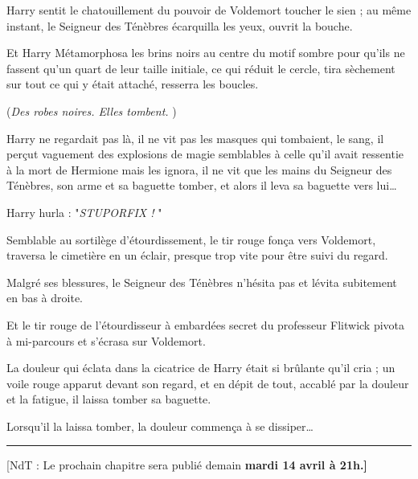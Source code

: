 Harry sentit le chatouillement du pouvoir de Voldemort toucher le sien ; au même instant, le Seigneur des Ténèbres écarquilla les yeux, ouvrit la bouche.

Et Harry Métamorphosa les brins noirs au centre du motif sombre pour qu'ils ne fassent qu'un quart de leur taille initiale, ce qui réduit le cercle, tira sèchement sur tout ce qui y était attaché, resserra les boucles.

(\emph{Des robes noires. Elles tombent.} )

Harry ne regardait pas là, il ne vit pas les masques qui tombaient, le sang, il perçut vaguement des explosions de magie semblables à celle qu'il avait ressentie à la mort de Hermione mais les ignora, il ne vit que les mains du Seigneur des Ténèbres, son arme et sa baguette tomber, et alors il leva sa baguette vers lui…

Harry hurla : "\emph{STUPORFIX !} "

Semblable au sortilège d'étourdissement, le tir rouge fonça vers Voldemort, traversa le cimetière en un éclair, presque trop vite pour être suivi du regard.

Malgré ses blessures, le Seigneur des Ténèbres n'hésita pas et lévita subitement en bas à droite.

Et le tir rouge de l'étourdisseur à embardées secret du professeur Flitwick pivota à mi-parcours et s'écrasa sur Voldemort.

La douleur qui éclata dans la cicatrice de Harry était si brûlante qu'il cria ; un voile rouge apparut devant son regard, et en dépit de tout, accablé par la douleur et la fatigue, il laissa tomber sa baguette.

Lorsqu'il la laissa tomber, la douleur commença à se dissiper…
\par\noindent\rule{\textwidth}{0.4pt}
[NdT : Le prochain chapitre sera publié demain \textbf{mardi 14 avril à 21h.]} 

